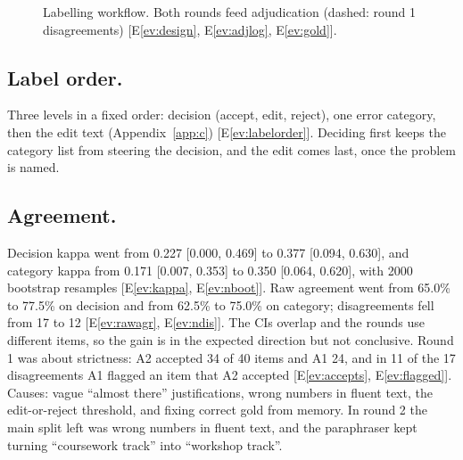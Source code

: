\documentclass[11pt,a4paper]{article}
\newcounter{ev}
\newcommand{\ev}[1]{E\ref{ev:#1}}
\begin{document}
\begin{figure}[h]
\centering
{}
\vspace{2pt}
\caption{Labelling workflow. Both rounds feed adjudication (dashed: round 1 disagreements) [\ev{design},
\ev{adjlog}, \ev{gold}].}\label{fig:lab}
\end{figure}

\subsection{Label order.}
Three levels in a fixed order: decision (accept, edit, reject), one error category, then the edit text
(Appendix~\ref{app:c}) [\ev{labelorder}]. Deciding first keeps the category list from steering the decision, and the
edit comes last, once the problem is named.

\subsection{Agreement.}
Decision kappa went from 0.227 [0.000, 0.469] to 0.377 [0.094, 0.630], and category kappa from 0.171
[0.007, 0.353] to 0.350 [0.064, 0.620], with 2000 bootstrap resamples [\ev{kappa}, \ev{nboot}]. Raw agreement went
from 65.0\% to 77.5\% on decision and from 62.5\% to 75.0\% on category; disagreements fell from 17 to 12
[\ev{rawagr}, \ev{ndis}]. The CIs overlap and the rounds use different items, so the gain is in the expected
direction but not conclusive. Round 1 was about strictness: A2 accepted 34 of 40 items and A1 24, and in 11 of the
17 disagreements A1 flagged an item that A2 accepted [\ev{accepts}, \ev{flagged}]. Causes: vague ``almost there''
justifications, wrong numbers in fluent text, the edit-or-reject threshold, and fixing correct gold from memory. In
round 2 the main split left was wrong numbers in fluent text, and the paraphraser kept turning ``coursework track''
into ``workshop track''.
\end{document}
